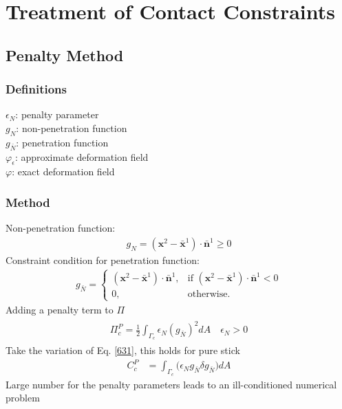 \documentclass[12pt,3p]{article}
\numberwithin{equation}{section}
\begin{document}
\section{Treatment of Contact Constraints}
\subsection{Penalty Method}
\subsubsection{Definitions}
$\epsilon_N$: penalty parameter \\
$g_N$: non-penetration function \\
$g_{\bar{N}}$: penetration function \\
$\varphi_{\epsilon}$: approximate deformation field \\
$\varphi$: exact deformation field

\subsubsection{Method}
Non-penetration function:
\begin{align}\label{nonPenFun}
g_{N} = (\mathbf{x}^2 - \mathbf{\bar{x}}^1) \cdot \mathbf{\bar{n}}^1 \geq 0
\end{align}
Constraint condition for penetration function: 
\begin{align}\label{penFun}
g_{\bar{N}} = \begin{cases}
    			(\mathbf{x}^2 - \mathbf{\bar{x}}^1) \cdot \mathbf{\bar{n}}^1, & \text{if } (\mathbf{x}^2 - \mathbf{\bar{x}}^1) \cdot \mathbf{\bar{n}}^1 < 0 \\
    			0, & \text{otherwise}.
  		   \end{cases}
\end{align}
Adding a penalty term to $\Pi$
\begin{align}\label{631}
\begin{split}
\Pi_c^P = \frac{1}{2} \int_{\Gamma_c} \epsilon_N (g_{\bar{N}})^2 dA \quad \epsilon_N > 0 
\end{split}
\end{align}
Take the variation of Eq. \ref{631}, this holds for pure stick 
\begin{align*}
C_c^P &= \int_{\Gamma_c} \big(\epsilon_N g_{\bar{N}} \delta g_{\bar{N}} \big) dA 
\end{align*}
Large number for the penalty parameters leads to an ill-conditioned numerical problem
\end{document}
